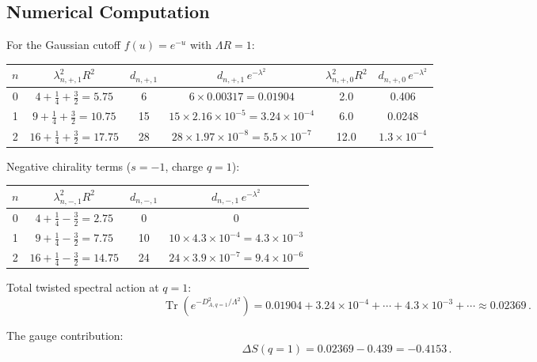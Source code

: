 \documentclass[11pt,a4paper]{article}
\newcommand{\Tr}{\operatorname{Tr}}
\begin{document}
\subsection{Numerical Computation}

For the Gaussian cutoff $f(u) = e^{-u}$ with $\Lambda R = 1$:

\begin{center}
\begin{longtable}{cccccc}
\toprule
$n$ & $\lambda_{n,+,1}^2 R^2$ & $d_{n,+,1}$ & $d_{n,+,1}\,e^{-\lambda^2}$ & $\lambda_{n,+,0}^2 R^2$ & $d_{n,+,0}\,e^{-\lambda^2}$ \\
\midrule
0 & $4 + \frac{1}{4} + \frac{3}{2} = 5.75$ & 6 & $6 \times 0.00317 = 0.01904$ & 2.0 & 0.406 \\
1 & $9 + \frac{1}{4} + \frac{3}{2} = 10.75$ & 15 & $15 \times 2.16\times10^{-5} = 3.24\times10^{-4}$ & 6.0 & 0.0248 \\
2 & $16 + \frac{1}{4} + \frac{3}{2} = 17.75$ & 28 & $28 \times 1.97\times10^{-8} = 5.5\times10^{-7}$ & 12.0 & $1.3\times10^{-4}$ \\
\bottomrule
\end{longtable}
\end{center}

Negative chirality terms ($s = -1$, charge $q = 1$):
\begin{center}
\begin{longtable}{cccc}
\toprule
$n$ & $\lambda_{n,-,1}^2 R^2$ & $d_{n,-,1}$ & $d_{n,-,1}\,e^{-\lambda^2}$ \\
\midrule
0 & $4 + \frac{1}{4} - \frac{3}{2} = 2.75$ & 0 & 0 \\
1 & $9 + \frac{1}{4} - \frac{3}{2} = 7.75$ & 10 & $10 \times 4.3\times10^{-4} = 4.3\times10^{-3}$ \\
2 & $16 + \frac{1}{4} - \frac{3}{2} = 14.75$ & 24 & $24 \times 3.9\times10^{-7} = 9.4\times10^{-6}$ \\
\bottomrule
\end{longtable}
\end{center}

Total twisted spectral action at $q = 1$:
\begin{equation}
\Tr(e^{-D_{A,q=1}^2/\Lambda^2}) = 0.01904 + 3.24\times10^{-4} + \cdots + 4.3\times10^{-3} + \cdots \approx 0.02369\,.
\end{equation}

The gauge contribution:
\begin{equation}
\Delta S(q=1) = 0.02369 - 0.439 = -0.4153\,.
\end{equation}
\end{document}
